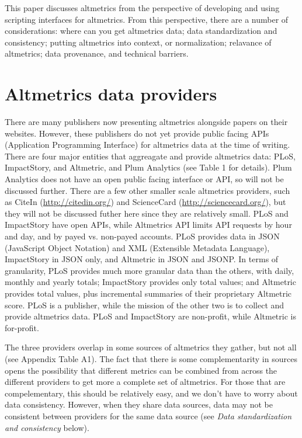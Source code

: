 \documentclass[letterpaper,superscriptaddress,showkeys,longbibliography]{revtex4-1}\usepackage{graphicx, color}
\begin{document}
This paper discusses altmetrics from the perspective of developing and using scripting interfaces for altmetrics. From this perspective, there are a number of considerations: where can you get altmetrics data; data standardization and consistency; putting altmetrics into context, or normalization; relavance of altmetrics; data provenance, and technical barriers.

\section*{Altmetrics data providers}

There are many publishers now presenting altmetrics alongside papers on their websites. However, these publishers do not yet provide public facing APIs (Application Programming Interface) for altmetrics data at the time of writing. There are four major entities that aggreagate and provide altmetrics data: PLoS, ImpactStory, and Altmetric, and Plum Analytics (see Table 1 for details). Plum Analytics does not have an open public facing interface or API, so will not be discussed further. There are a few other smaller scale altmetrics providers, such as CiteIn (\url{http://citedin.org/}) and ScienceCard (\url{http://sciencecard.org/}), but they will not be discussed futher here since they are relatively small. PLoS and ImpactStory have open APIs, while Altmetrics API limits API requests by hour and day, and by payed vs. non-payed accounts. PLoS provides data in JSON (JavaScript Object Notation) and XML (Extensible Metadata Language), ImpactStory in JSON only, and Altmetric in JSON and JSONP. In terms of granularity, PLoS provides much more granular data than the others, with daily, monthly and yearly totals; ImpactStory provides only total values; and Altmetric provides total values, plus incremental summaries of their proprietary Altmetric score. PLoS is a publisher, while the mission of the other two is to collect and provide altmetrics data. PLoS and ImpactStory are non-profit, while Altmetric is for-profit.

The three providers overlap in some sources of altmetrics they gather, but not all (see Appendix Table A1). The fact that there is some complementarity in sources opens the possibility that different metrics can be combined from across the different providers to get more a complete set of altmetrics. For those that are compelementary, this should be relatively easy, and we don't have to worry about data consistency. However, when they share data sources, data may not be consistent between providers for the same data source (see \emph{Data standardization and consistency} below).
\end{document}
